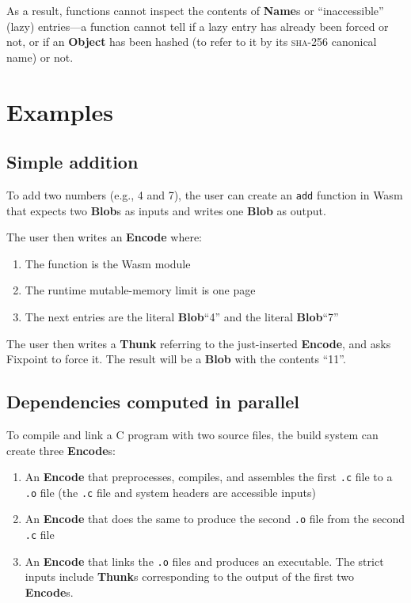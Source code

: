 \documentclass{article}
\newcommand{\blob}{\textbf{Blob}\xspace}
\newcommand{\blobs}{\textbf{Blob}s\xspace}
\newcommand{\object}{\textbf{Object}\xspace}
\newcommand{\encode}{\textbf{Encode}\xspace}
\newcommand{\thunk}{\textbf{Thunk}\xspace}
\newcommand{\thunks}{\textbf{Thunk}s\xspace}
\newcommand{\encodes}{\textbf{Encode}s\xspace}
\newcommand{\names}{\textbf{Name}s\xspace}
\newcommand{\bs}{\vspace{\baselineskip}}
\begin{document}
As a result, functions cannot inspect the contents of \names or
``inaccessible'' (lazy) entries---a function cannot tell if a lazy
entry has already been forced or not, or if an \object has been hashed
(to refer to it by its \textsc{sha-256} canonical name) or not.

\section{Examples}

\subsection{Simple addition} To add two numbers (e.g., 4 and
7), the user can create an \texttt{add} function in Wasm that expects
two \blobs as inputs and writes one \blob as output.

\bs

The user then writes an \encode where:
\begin{enumerate}[itemsep=0pt]
\item The function is the Wasm module
\item The runtime mutable-memory limit is one page
\item The next entries are the literal \blob ``4'' and the literal \blob ``7''
\end{enumerate}

The user then writes a \thunk referring to the just-inserted \encode,
and asks Fixpoint to force it. The result will be a \blob with the
contents ``11''.

\subsection{Dependencies computed in parallel} To compile and link a C program with two source files,
the build system can create three \encodes:
\begin{enumerate}[itemsep=0pt]
\item An \encode that preprocesses, compiles, and assembles the first \texttt{.c} file to a \texttt{.o} file
  (the \texttt{.c} file and system headers are accessible inputs)
\item An \encode that does the same to produce the second \texttt{.o} file from the second \texttt{.c} file
\item An \encode that links the \texttt{.o} files and produces an executable. The strict inputs include \thunks corresponding to the output of the first two \encodes.
\end{enumerate}
\end{document}
